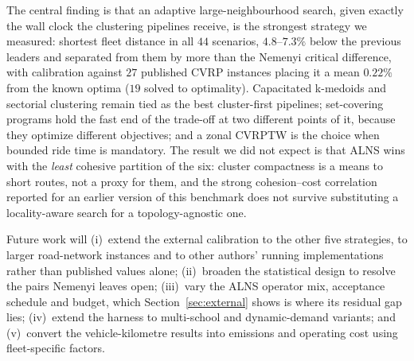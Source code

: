 \documentclass[graybox]{SNmult}
\begin{document}
The central finding is that an adaptive large-neighbourhood search, given
exactly the wall clock the clustering pipelines receive, is the strongest
strategy we measured: shortest fleet distance in all $44$ scenarios,
$4.8$--$7.3\%$ below the previous leaders and separated from them by more
than the Nemenyi critical difference, with calibration against $27$
published CVRP instances placing it a mean $0.22\%$ from the known optima
($19$ solved to optimality). Capacitated k-medoids and sectorial
clustering remain tied as the best cluster-first pipelines; set-covering
programs hold the fast end of the trade-off at two different points of it,
because they optimize different objectives; and a zonal CVRPTW is the
choice when bounded ride time is mandatory. The result we did not expect
is that ALNS wins with the \emph{least} cohesive partition of the six:
cluster compactness is a means to short routes, not a proxy for them, and
the strong cohesion--cost correlation reported for an earlier version of
this benchmark does not survive substituting a locality-aware search for a
topology-agnostic one.

Future work will (i)~extend the external calibration to the other five
strategies, to larger road-network instances and to other authors' running
implementations rather than published values alone; (ii)~broaden the
statistical design to resolve the pairs Nemenyi leaves open; (iii)~vary
the ALNS operator mix, acceptance schedule and budget, which
Section~\ref{sec:external} shows is where its residual gap lies;
(iv)~extend the harness to multi-school and dynamic-demand variants; and
(v)~convert the vehicle-kilometre results into emissions and operating
cost using fleet-specific factors.




\end{document}
